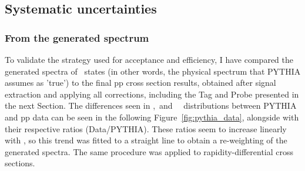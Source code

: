 \subsection{Systematic uncertainties}
\label{sec:acceff_syst}
\subsubsection*{From the generated \texorpdfstring{\PgU}{y} spectrum}

 To validate the strategy used for acceptance and efficiency,
I have compared the generated spectra of \PgU\ states (in other words,
the physical spectrum that PYTHIA assumes as 'true') to the final pp cross
section results, obtained after signal extraction and applying all
corrections, including the Tag and Probe presented in the next Section. The differences seen in \PgUa,\PgUb\ and \PgUc\ \pt\
distributions between PYTHIA and pp data can be seen in the following
Figure~\ref{fig:pythia_data}, alongside with their respective ratios
(Data/PYTHIA). These ratios seem to increase linearly with
\pt, so this trend was fitted to a straight line to obtain a
re-weighting of the generated spectra. The same procedure was applied
to rapidity-differential cross sections.%

